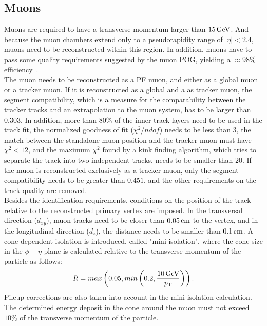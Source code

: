 \subsection{Muons}
Muons are required to have a transverse momentum larger than $15\,\text{Ge\hspace{-.08em}V}$. And because the muon chambers extend only to a pseudorapidity range of $|\eta|<2.4$, muons need to be reconstructed within this region. In addition, muons have to pass some quality requirements suggested by the muon POG, yielding a $\approx 98\%$ efficiency~\cite{MuonIDPerf}.\\
The muon needs to be reconstructed as a PF muon, and either as a global muon or a tracker muon. If it is reconstructed as a global and a as tracker muon, the segment compatibility, which is a measure for the comparability between the tracker tracks and an extrapolation to the muon system, has to be larger than $0.303$. In addition, more than $80\%$ of the inner track layers need to be used in the track fit, the normalized goodness of fit ($\chi^2/ndof$) needs to be less than $3$, the match between the standalone muon position and the tracker muon must have $\chi^2<12$, and the maximum $\chi^2$ found by a kink finding algorithm, which tries to separate the track into two independent tracks, needs to be smaller than $20$. If the muon is reconstructed exclusively as a tracker muon, only the segment compatibility needs to be greater than $0.451$, and the other requirements on the track quality are removed.\\
Besides the identification requirements, conditions on the position of the track relative to the reconstructed primary vertex are imposed. In the transversal direction ($d_{xy}$), muon tracks need to be closer than $0.05\,\text{cm}$ to the vertex, and in the longitudinal direction ($d_z$), the distance needs to be smaller than $0.1\,\text{cm}$. A cone dependent isolation is introduced, called "mini isolation", where the cone size in the $\phi-\eta$ plane is calculated relative to the transverse momentum of the particle as follows:
\begin{equation}
 R = max\left(0.05,min\left(0.2,\frac{10\,\text{Ge\hspace{-.08em}V}}{p_{\mathrm{T}}}\right)\right).
\end{equation}
Pileup corrections are also taken into account in the mini isolation calculation.
The determined energy deposit in the cone around the muon must not exceed $10\%$ of the transverse momentum of the particle.



